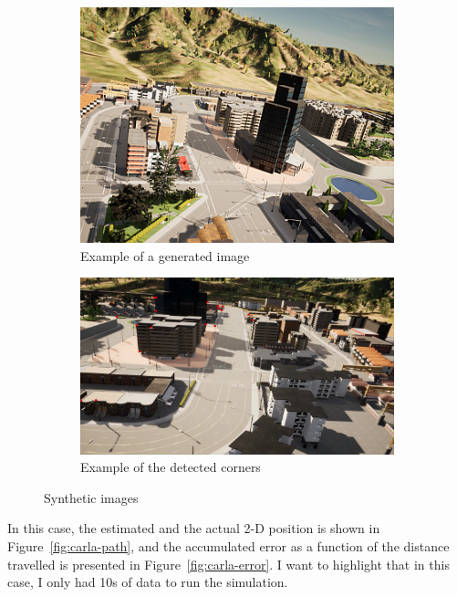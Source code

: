 \begin{figure}[!ht]
    \centering
    \begin{subfigure}{0.45\textwidth}
        \includegraphics[width=\textwidth]{figures/carla-img-example.png}
        \caption{Example of a generated image}\label{fig:carla-1}
    \end{subfigure}
    \begin{subfigure}{0.45\textwidth}
        \includegraphics[width=\textwidth]{figures/carla-img-corner.png}
        \caption{Example of the detected corners}\label{fig:carla-2}
    \end{subfigure}
    \caption{Synthetic images}\label{fig:carla}
\end{figure}

In this case, the estimated and the actual 2-D position is shown in Figure~\ref{fig:carla-path}, and the accumulated error as a function of the distance travelled is presented in Figure~\ref{fig:carla-error}. I want to highlight that in this case, I only had 10\si{\second} of data to run the simulation.

